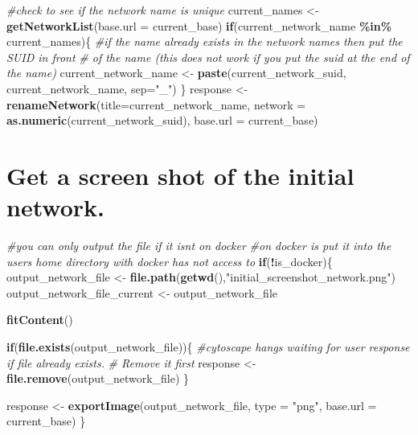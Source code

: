 \documentclass[
]{book}
\newenvironment{Shaded}{\begin{snugshade}}{\end{snugshade}}
\newcommand{\AttributeTok}[1]{\textcolor[rgb]{0.13,0.29,0.53}{#1}}
\newcommand{\CommentTok}[1]{\textcolor[rgb]{0.56,0.35,0.01}{\textit{#1}}}
\newcommand{\ControlFlowTok}[1]{\textcolor[rgb]{0.13,0.29,0.53}{\textbf{#1}}}
\newcommand{\FunctionTok}[1]{\textcolor[rgb]{0.13,0.29,0.53}{\textbf{#1}}}
\newcommand{\NormalTok}[1]{#1}
\newcommand{\OtherTok}[1]{\textcolor[rgb]{0.56,0.35,0.01}{#1}}
\newcommand{\SpecialCharTok}[1]{\textcolor[rgb]{0.81,0.36,0.00}{\textbf{#1}}}
\newcommand{\StringTok}[1]{\textcolor[rgb]{0.31,0.60,0.02}{#1}}
\begin{document}
\begin{Shaded}
\begin{Highlighting}[]
\CommentTok{\#check to see if the network name is unique}
\NormalTok{current\_names }\OtherTok{\textless{}{-}} \FunctionTok{getNetworkList}\NormalTok{(}\AttributeTok{base.url =}\NormalTok{ current\_base)}
\ControlFlowTok{if}\NormalTok{(current\_network\_name }\SpecialCharTok{\%in\%}\NormalTok{ current\_names)\{}
  \CommentTok{\#if the name already exists in the network names then put the SUID in front}
  \CommentTok{\# of the name (this does not work if you put the suid at the end of the name)}
\NormalTok{  current\_network\_name }\OtherTok{\textless{}{-}} \FunctionTok{paste}\NormalTok{(current\_network\_suid,}
\NormalTok{                                current\_network\_name,  }\AttributeTok{sep=}\StringTok{"\_"}\NormalTok{)}
\NormalTok{\}}
\NormalTok{response }\OtherTok{\textless{}{-}} \FunctionTok{renameNetwork}\NormalTok{(}\AttributeTok{title=}\NormalTok{current\_network\_name, }
                       \AttributeTok{network =} \FunctionTok{as.numeric}\NormalTok{(current\_network\_suid),}
                       \AttributeTok{base.url =}\NormalTok{ current\_base)}
\end{Highlighting}
\end{Shaded}

\section{Get a screen shot of the initial network.}\label{get-a-screen-shot-of-the-initial-network.}

\begin{Shaded}
\begin{Highlighting}[]
\CommentTok{\#you can only output the file if it isn\textquotesingle{}t on docker}
\CommentTok{\#on docker is put it into the user\textquotesingle{}s home directory with docker has not access to}
\ControlFlowTok{if}\NormalTok{(}\SpecialCharTok{!}\NormalTok{is\_docker)\{}
\NormalTok{  output\_network\_file }\OtherTok{\textless{}{-}} \FunctionTok{file.path}\NormalTok{(}\FunctionTok{getwd}\NormalTok{(),}\StringTok{"initial\_screenshot\_network.png"}\NormalTok{)}
\NormalTok{  output\_network\_file\_current }\OtherTok{\textless{}{-}}\NormalTok{ output\_network\_file}

  \FunctionTok{fitContent}\NormalTok{()}

  \ControlFlowTok{if}\NormalTok{(}\FunctionTok{file.exists}\NormalTok{(output\_network\_file))\{}
    \CommentTok{\#cytoscape hangs waiting for user response if file already exists.  }
    \CommentTok{\# Remove it first}
\NormalTok{    response }\OtherTok{\textless{}{-}} \FunctionTok{file.remove}\NormalTok{(output\_network\_file)}
\NormalTok{  \} }

\NormalTok{  response }\OtherTok{\textless{}{-}} \FunctionTok{exportImage}\NormalTok{(output\_network\_file, }\AttributeTok{type =} \StringTok{"png"}\NormalTok{,}
                          \AttributeTok{base.url =}\NormalTok{ current\_base)}
\NormalTok{\}}
\end{Highlighting}
\end{Shaded}
\end{document}
